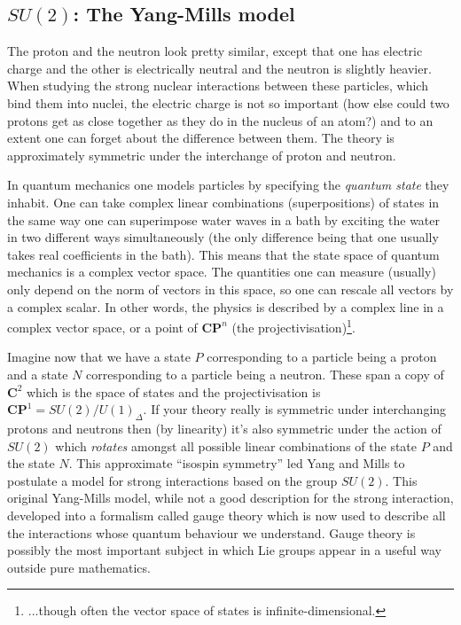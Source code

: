 \documentclass[12pt]{article}
\newcommand{\CC}{\mathbf{C}}
\newcommand{\PP}{\mathbf{P}}
\theoremstyle{definition}
\theoremstyle{check}
\theoremstyle{remark}
\theoremstyle{TheoremNum}
\begin{document}
\subsection{\texorpdfstring{$SU(2)$}{SU(2)}: The Yang-Mills model}

The proton and the neutron look pretty similar, except that one has electric charge and the other is electrically neutral and the neutron is slightly heavier. When studying the strong nuclear interactions between these particles, which bind them into nuclei, the electric charge is not so important (how else could two protons get as close together as they do in the nucleus of an atom?) and to an extent one can forget about the difference between them. The theory is approximately symmetric under the interchange of proton and neutron.

In quantum mechanics one models particles by specifying the {\em quantum state} they inhabit. One can take complex linear combinations (superpositions) of states in the same way one can superimpose water waves in a bath by exciting the water in two different ways simultaneously (the only difference being that one usually takes real coefficients in the bath). This means that the state space of quantum mechanics is a complex vector space. The quantities one can measure (usually) only depend on the norm of vectors in this space, so one can rescale all vectors by a complex scalar. In other words, the physics is described by a complex line in a complex vector space, or a point of $\CC\PP^n$ (the projectivisation)\footnote{...though often the vector space of states is infinite-dimensional.}.

Imagine now that we have a state $P$ corresponding to a particle being a proton and a state $N$ corresponding to a particle being a neutron. These span a copy of $\CC^2$ which is the space of states and the projectivisation is $\CC\PP^1=SU(2)/U(1)_{\Delta}$. If your theory really is symmetric under interchanging protons and neutrons then (by linearity) it's also symmetric under the action of $SU(2)$ which {\em rotates} amongst all possible linear combinations of the state $P$ and the state $N$. This approximate ``isospin symmetry'' led Yang and Mills to postulate a model for strong interactions based on the group $SU(2)$. This original Yang-Mills model, while not a good description for the strong interaction, developed into a formalism called gauge theory which is now used to describe all the interactions whose quantum behaviour we understand. Gauge theory is possibly the most important subject in which Lie groups appear in a useful way outside pure mathematics.
\end{document}
